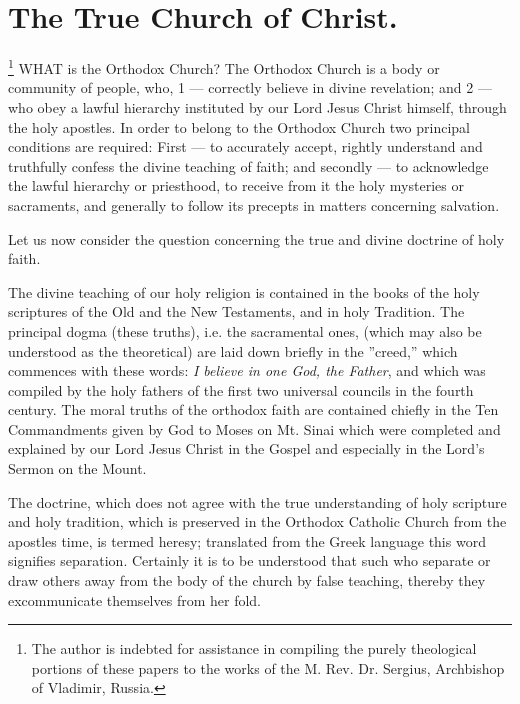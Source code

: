 \chapter{The True Church of Christ.}

\footnote{The author is indebted for assistance in compiling the purely theological portions of these papers to the works of the M. Rev. Dr. Sergius, Archbishop of Vladimir, Russia.}
WHAT is the Orthodox Church? The 
Orthodox Church is a body or community
of people, who, 1 — correctly believe in divine revelation;
and 2 — who obey a lawful hierarchy instituted by our Lord 
Jesus Christ himself, through the holy apostles.
In order to belong to the Orthodox Church two principal conditions
are required: First — to accurately accept,
rightly understand and truthfully confess 
the divine teaching of faith; and secondly — 
to acknowledge the lawful hierarchy or priesthood,
to receive from it the holy mysteries or 
sacraments, and generally to follow its precepts 
in matters concerning salvation. 

Let us now consider the question concerning 
the true and divine doctrine of holy faith. 

The divine teaching of our holy religion is 
contained in the books of the holy scriptures of 
the Old and the New Testaments, and in holy 
Tradition. The principal dogma (these truths), 
i.e. the sacramental ones, (which may also be understood
as the theoretical) are laid down briefly 
in the ''creed,'' which commences with these 
words: \textit{I believe in one God, the Father}, and 
which was compiled by the holy fathers of the 
first two universal councils in the fourth century.
The moral truths of the orthodox faith 
are contained chiefly in the Ten Commandments 
given by God to Moses on Mt. Sinai 
which were completed and explained by our 
Lord Jesus Christ in the Gospel and especially in 
the Lord's Sermon on the Mount. 

The doctrine, which does not agree with the 
true understanding of holy scripture and holy 
tradition, which is preserved in the Orthodox
Catholic Church from the apostles time, is
termed heresy; translated from the Greek
language this word signifies separation. Certainly
it is to be understood that such who separate
or draw others away from the body of the 
church by false teaching, thereby they excommunicate
themselves from her fold. 

